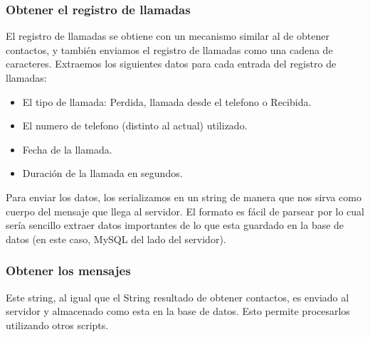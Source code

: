 \subsubsection{Obtener el registro de llamadas}

El registro de llamadas se obtiene con un mecanismo similar al de obtener contactos, y también
enviamos el registro de llamadas como una cadena de caracteres. Extraemos los siguientes datos
para cada entrada del registro de llamadas:

\begin{itemize}
	\item El tipo de llamada: Perdida, llamada desde el telefono o Recibida.
	\item El numero de telefono (distinto al actual) utilizado.
	\item Fecha de la llamada.
	\item Duración de la llamada en segundos.
\end{itemize}

Para enviar los datos, los serializamos en un string de manera que nos sirva como
cuerpo del mensaje que llega al servidor. El formato es fácil de parsear por lo cual
sería sencillo extraer datos importantes de lo que esta guardado en la base de datos
(en este caso, MySQL del lado del servidor).

\subsubsection{Obtener los mensajes}

Este string, al igual que el String resultado de obtener contactos, es enviado al
servidor y almacenado como esta en la base de datos. Esto permite procesarlos
utilizando otros scripts.

%
%
%

